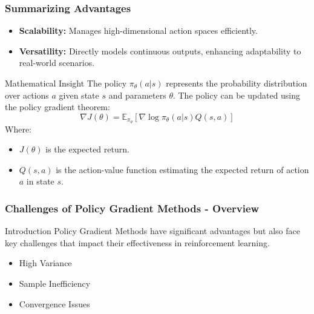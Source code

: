 \documentclass{beamer}
\begin{document}
\begin{frame}[fragile]
    \frametitle{Summarizing Advantages}
    
    \begin{itemize}
        \item \textbf{Scalability:} Manages high-dimensional action spaces efficiently.
        \item \textbf{Versatility:} Directly models continuous outputs, enhancing adaptability to real-world scenarios.
    \end{itemize}

    \begin{block}{Mathematical Insight}
        The policy \( \pi_\theta(a|s) \) represents the probability distribution over actions \( a \) given state \( s \) and parameters \( \theta \). 
        The policy can be updated using the policy gradient theorem:
        \begin{equation}
            \nabla J(\theta) = \mathbb{E}_{\pi_\theta} \left[ \nabla \log \pi_\theta(a|s) Q(s, a) \right]
        \end{equation}
        Where:
        \begin{itemize}
            \item \( J(\theta) \) is the expected return.
            \item \( Q(s, a) \) is the action-value function estimating the expected return of action \( a \) in state \( s \).
        \end{itemize}
    \end{block}
\end{frame}

\begin{frame}[fragile]
    \frametitle{Challenges of Policy Gradient Methods - Overview}
    \begin{block}{Introduction}
        Policy Gradient Methods have significant advantages but also face key challenges that impact their effectiveness in reinforcement learning.
    \end{block}
    \begin{itemize}
        \item High Variance
        \item Sample Inefficiency
        \item Convergence Issues
    \end{itemize}
\end{frame}
\end{document}
